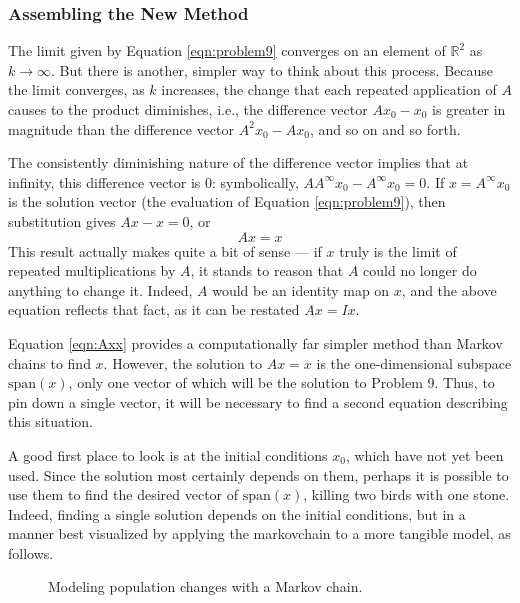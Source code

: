 \documentclass[titlepage]{article}
\newcommand{\spn}[1]{\text{span}\left( #1 \right)}
\newcommand{\R}{\mathbb{R}}
\begin{document}
\subsubsection{Assembling the New Method}\label{ss2:assemble}
The limit given by Equation \ref{eqn:problem9} converges on an element of $\R^2$ as $k\to\infty$. But there is another, simpler way to think about this process. Because the limit converges, as $k$ increases, the change that each repeated application of $A$ causes to the product diminishes, i.e., the difference vector $Ax_0-x_0$ is greater in magnitude than the difference vector $A^2x_0-Ax_0$, and so on and so forth.\par
The consistently diminishing nature of the difference vector implies that at infinity, this difference vector is 0: symbolically, $AA^\infty x_0-A^\infty x_0=0$. If $x=A^\infty x_0$ is the solution vector (the evaluation of Equation \ref{eqn:problem9}), then substitution gives $Ax-x=0$, or
\begin{equation}\label{eqn:Axx}
    Ax = x
\end{equation}
This result actually makes quite a bit of sense --- if $x$ truly is the limit of repeated multiplications by $A$, it stands to reason that $A$ could no longer do anything to change it. Indeed, $A$ would be an identity map on $x$, and the above equation reflects that fact, as it can be restated $Ax=Ix$.\par
Equation \ref{eqn:Axx} provides a computationally far simpler method than Markov chains to find $x$. However, the solution to $Ax=x$ is the one-dimensional subspace $\spn{x}$, only one vector of which will be the solution to Problem 9. Thus, to pin down a single vector, it will be necessary to find a second equation describing this situation.\par
A good first place to look is at the initial conditions $x_0$, which have not yet been used. Since the solution most certainly depends on them, perhaps it is possible to use them to find the desired vector of $\spn{x}$, killing two birds with one stone. Indeed, finding a single solution depends on the initial conditions, but in a manner best visualized by applying the \Gls{markovchain} to a more tangible model, as follows.

\begin{figure}[h!]
    \centering
    \caption{Modeling population changes with a Markov chain.}
    \label{fig:population}
\end{figure}
\end{document}
